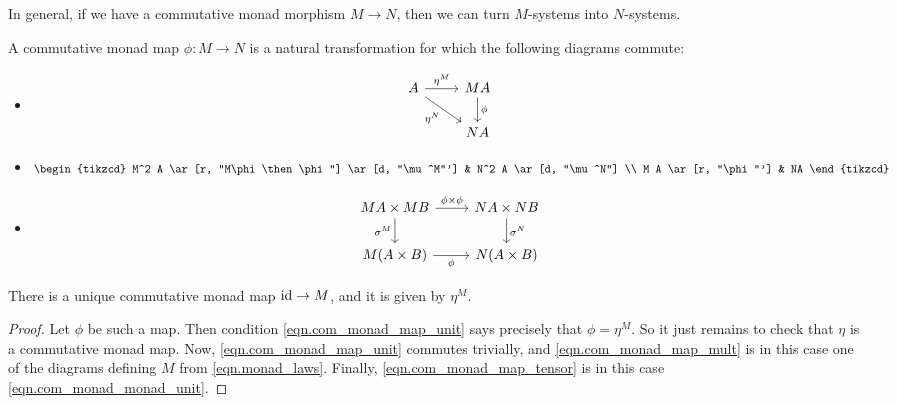 \documentclass[DynamicalBook]{subfiles}
\begin{document}
In general, if we have a commutative monad morphism $M \to N$, then we can turn
$M$-systems into $N$-systems.

\begin{definition}\label{def.com_monad_map}
A commutative monad map $\phi : M \to N$ is a natural transformation for which
the following diagrams commute:
\begin{itemize}
\item
  \begin{equation}\label{eqn.com_monad_map_unit}
    \begin{tikzcd}
    A \ar[r, "\eta^M"] \ar[dr, "\eta^N"'] & M A \ar[d, "\phi"] \\
    & N A
    \end{tikzcd}
  \end{equation}
\item
  \begin{equation}\label{eqn.com_monad_map_mult}
    \begin{tikzcd}
    M^2 A \ar[r, "M\phi \then \phi"] \ar[d, "\mu^M"'] & N^2 A \ar[d, "\mu^N"] \\
    M A \ar[r, "\phi"'] & NA
    \end{tikzcd}
  \end{equation}
\item
  \begin{equation}\label{eqn.com_monad_map_tensor}
    \begin{tikzcd}
    MA \times M B \ar[r, "\phi \times \phi"] \ar[d, "\sigma^M"'] & N A \times N B \ar[d, "\sigma^N"] \\
    M (A \times B) \ar[r, "\phi"'] & N(A \times B)
    \end{tikzcd}
  \end{equation}
\end{itemize}
\end{definition}


\begin{proposition}
  There is a unique commutative monad map $\mathrm{id} \to M$, and it is given by
  $\eta^M$. \end{proposition}
\begin{proof}
Let $\phi$ be such a map. Then condition \cref{eqn.com_monad_map_unit} says
precisely that $\phi = \eta^M$. So it just remains to check that $\eta$ is a commutative monad map.
  Now, \cref{eqn.com_monad_map_unit} commutes trivially, and
  \cref{eqn.com_monad_map_mult} is in this case one of the diagrams defining $M$
  from \cref{eqn.monad_laws}. Finally, \cref{eqn.com_monad_map_tensor} is in
  this case \cref{eqn.com_monad_monad_unit}.
\end{proof}
\end{document}
